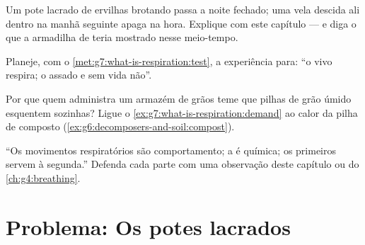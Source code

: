 \begin{exercise}[$\star\star$]\label{exo:g7:what-is-respiration:9}
Um pote lacrado de ervilhas brotando passa a noite fechado; uma vela
descida ali dentro na manhã seguinte apaga na hora. Explique com este
capítulo --- e diga o que a armadilha de  teria mostrado
nesse meio-tempo.
\end{exercise}

\begin{exercise}[$\star\star$]\label{exo:g7:what-is-respiration:10}
Planeje, com o \cref{met:g7:what-is-respiration:test}, a experiência
para: ``o  vivo respira; o  assado e sem vida não''.
\end{exercise}

\begin{exercise}[$\star\star$]\label{exo:g7:what-is-respiration:11}
Por que quem administra um armazém de grãos teme que pilhas de grão
úmido esquentem sozinhas? Ligue o
\cref{ex:g7:what-is-respiration:demand} ao calor da pilha de composto
(\cref{ex:g6:decomposers-and-soil:compost}).
\end{exercise}

\begin{exercise}[$\star\star\star$]\label{exo:g7:what-is-respiration:12}
``Os movimentos respiratórios são comportamento; a  é
química; os primeiros servem à segunda.'' Defenda cada parte com uma
observação deste capítulo ou do \cref{ch:g4:breathing}.
\end{exercise}

\section{Problema: Os potes lacrados}

